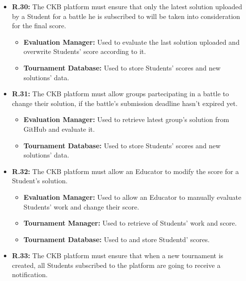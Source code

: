 \documentclass{article}
\begin{document}
{\begin{itemize}
\begin{itemize}
              \item \textbf{Evaluation Manager:} Used to evaluate solutions uploaded on GitHub by Students.
              \item \textbf{Tournament Database:} Used to store Students' scores.
          \end{itemize}
    \item \textbf{R.30:} The CKB platform must ensure that only the latest solution uploaded by a Student for a battle he is subscribed to will
          be taken into consideration for the final score.
          \begin{itemize}
              \item \textbf{Evaluation Manager:} Used to evaluate the last solution uploaded and
              overwrite Students' score according to it.
              \item \textbf{Tournament Database:} Used to store Students' scores and new solutions' data.
          \end{itemize}
    \item \textbf{R.31:} The CKB platform must allow groups partecipating in a battle to change their solution,
          if the battle's submission deadline hasn't expired yet.
          \begin{itemize}
            \item \textbf{Evaluation Manager:} Used to retrieve latest group's solution from GitHub and evaluate it.
              \item \textbf{Tournament Database:} Used to store Students' scores and new solutions' data.
          \end{itemize}
    \item \textbf{R.32:} The CKB platform must allow an Educator to modify the score for a Student's solution.
          \begin{itemize}
              \item \textbf{Evaluation Manager:} Used to allow an Educator to manually evaluate Students'
              work and change their score.
              \item \textbf{Tournament Manager:} Used to retrieve of Students' work and score.
              \item \textbf{Tournament Database:} Used to and store Studentd' scores.
          \end{itemize}
    \item \textbf{R.33:} The CKB platform must ensure that when a new tournament is created, all
          Students subscribed to the platform are going to receive a notification.

\end{itemize}}
\end{document}
